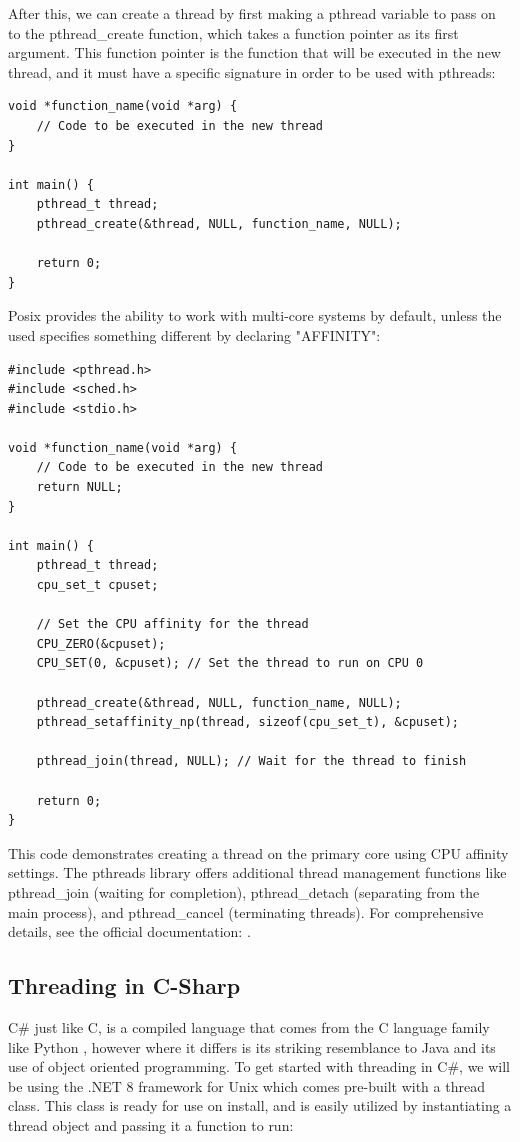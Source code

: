 \documentclass[12pt,a4paper]{article}
\begin{document}
After this, we can create a thread by first making a pthread variable to pass on to the pthread\_create function, which takes a function pointer as its first argument. This function pointer is the function that will be executed in the new thread, and it must have a specific signature in order to be used with pthreads:

\begin{verbatim}
void *function_name(void *arg) {
    // Code to be executed in the new thread
}

int main() {
    pthread_t thread;
    pthread_create(&thread, NULL, function_name, NULL);

    return 0;
}
\end{verbatim}

Posix provides the ability to work with multi-core systems by default, unless the used specifies something different by declaring "AFFINITY":

\begin{verbatim}
#include <pthread.h>
#include <sched.h>
#include <stdio.h>

void *function_name(void *arg) {
    // Code to be executed in the new thread
    return NULL;
}

int main() {
    pthread_t thread;
    cpu_set_t cpuset;

    // Set the CPU affinity for the thread
    CPU_ZERO(&cpuset);
    CPU_SET(0, &cpuset); // Set the thread to run on CPU 0

    pthread_create(&thread, NULL, function_name, NULL);
    pthread_setaffinity_np(thread, sizeof(cpu_set_t), &cpuset);

    pthread_join(thread, NULL); // Wait for the thread to finish

    return 0;
}
\end{verbatim}

This code demonstrates creating a thread on the primary core using CPU affinity settings. The pthreads library offers additional thread management functions like pthread\_join (waiting for completion), pthread\_detach (separating from the main process), and pthread\_cancel (terminating threads). For comprehensive details, see the official documentation: .

\subsection{Threading in C-Sharp}

C\# just like C, is a compiled language that comes from the C language family like Python \parencite{PythonFAQ}, however where it differs is its striking resemblance to Java and its use of object oriented programming. To get started with threading in C\#, we will be using the .NET 8 framework for Unix which comes pre-built with a thread class. This class is ready for use on install, and is easily utilized by instantiating a thread object\parencite{CSThreadClass} and passing it a function to run:
\end{document}
